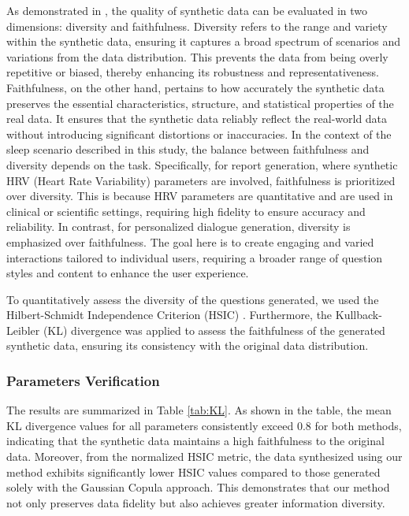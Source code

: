 \documentclass[preprint,12pt]{elsarticle}
\begin{document}
As demonstrated in \cite{gan2024towards}, the quality of synthetic data can be evaluated in two dimensions: diversity and faithfulness. Diversity refers to the range and variety within the synthetic data, ensuring it captures a broad spectrum of scenarios and variations from the data distribution. This prevents the data from being overly repetitive or biased, thereby enhancing its robustness and representativeness. Faithfulness, on the other hand, pertains to how accurately the synthetic data preserves the essential characteristics, structure, and statistical properties of the real data. It ensures that the synthetic data reliably reflect the real-world data without introducing significant distortions or inaccuracies.
In the context of the sleep scenario described in this study, the balance between faithfulness and diversity depends on the task. Specifically, for report generation, where synthetic HRV (Heart Rate Variability) parameters are involved, faithfulness is prioritized over diversity. This is because HRV parameters are quantitative and are used in clinical or scientific settings, requiring high fidelity to ensure accuracy and reliability. In contrast, for personalized dialogue generation, diversity is emphasized over faithfulness. The goal here is to create engaging and varied interactions tailored to individual users, requiring a broader range of question styles and content to enhance the user experience.

To quantitatively assess the diversity of the questions generated, we used the Hilbert-Schmidt Independence Criterion (HSIC) \cite{gan2024towards}. Furthermore, the Kullback-Leibler (KL) divergence was applied to assess the faithfulness of the generated synthetic data, ensuring its consistency with the original data distribution.

\subsubsection{Parameters Verification}
The results are summarized in Table \ref{tab:KL}. As shown in the table, the mean KL divergence values for all parameters consistently exceed 0.8 for both methods, indicating that the synthetic data maintains a high faithfulness to the original data. Moreover, from the normalized HSIC metric, the data synthesized using our method exhibits significantly lower HSIC values compared to those generated solely with the Gaussian Copula approach. This demonstrates that our method not only preserves data fidelity but also achieves greater information diversity.
\end{document}
